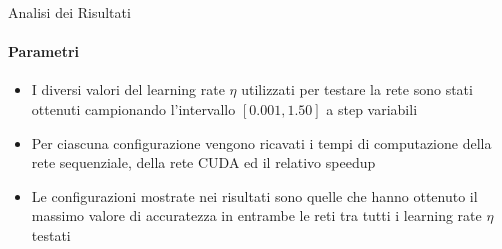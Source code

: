 \documentclass[
 ]{beamer}
\begin{document}
\begin{frame}{Analisi dei Risultati}
    \framesubtitle{Parametri}
    \smallskip
    \begin{itemize} [<+->]
        \setlength\itemsep{2.5em}
        \item \large I diversi valori del learning rate $\eta$ utilizzati per testare la rete sono stati ottenuti campionando l'intervallo $[0.001, 1.50]$ a step variabili
        \item \large Per ciascuna configurazione vengono ricavati i tempi di computazione della rete sequenziale, della rete CUDA ed il relativo speedup
        \item \large Le configurazioni mostrate nei risultati sono quelle che hanno ottenuto il massimo valore di accuratezza in entrambe le reti tra tutti i learning rate $\eta$ testati
    \end{itemize}     
\end{frame}


\end{document}
